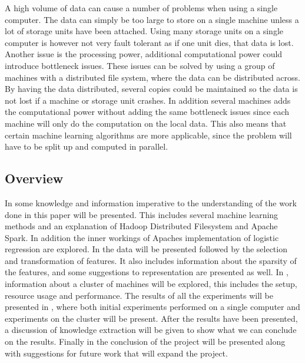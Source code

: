 A high volume of data can cause a number of problems when using a single computer. The data can simply be too large to store on a single machine unless a lot of storage units have been attached. Using many storage units on a single computer is however not very fault tolerant as if one unit dies, that data is lost. Another issue is the processing power, additional computational power could introduce bottleneck issues. These issues can be solved by using a group of machines with a distributed file system, where the data can be distributed across. By having the data distributed, several copies could be maintained so the data is not lost if a machine or storage unit crashes. In addition several machines adds the computational power without adding the same bottleneck issues since each machine will only do the computation on the local data.
This also means that certain machine learning algorithms are more applicable, since the problem will have to be split up and computed in parallel. 

\subsection{Overview}\label{sec:overview}
In  some knowledge and information imperative to the understanding of the work done in this paper will be presented. This includes several machine learning methods and an explanation of Hadoop Distributed Filesystem and Apache Spark. In addition the inner workings of Apaches implementation of logistic regression are explored. 
In  the data will be presented followed by the selection and transformation of features. It also includes information about the sparsity of the features, and some suggestions to representation are presented as well.  
In , information about a cluster of machines will be explored, this includes the setup, resource usage and performance. 
The results of all the experiments will be presented in , where both initial experiments performed on a single computer and experiments on the cluster will be present. After the results have been presented, a discussion of knowledge extraction will be given to show what we can conclude on the results. 
Finally in  the conclusion of the project will be presented along with suggestions for future work that will expand the project.



